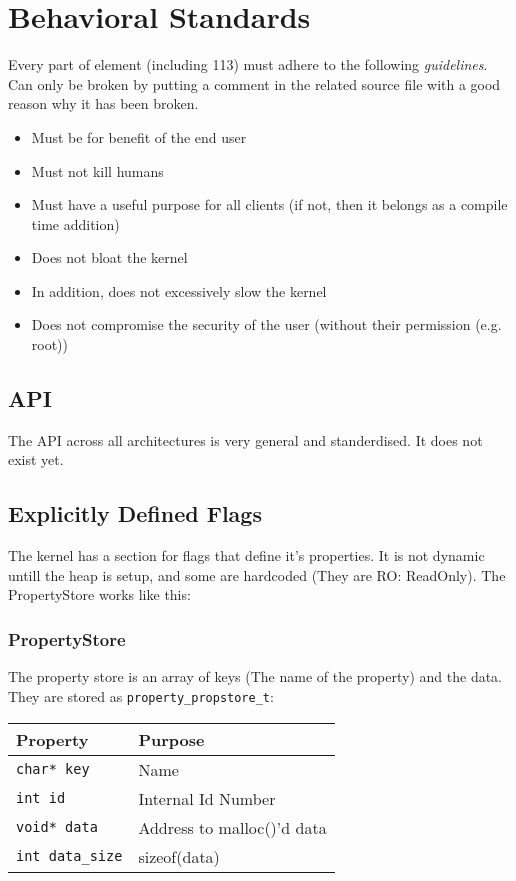 \documentclass[12pt]{article}
\begin{document}
\section{Behavioral Standards}
Every part of element (including 113) must adhere to the following \emph{guidelines}. Can only be broken by putting a comment in the related source file with a good reason why it has been broken.
\begin{itemize}
  \item Must be for benefit of the end user
  \item Must not kill humans
  \item Must have a useful purpose for all clients (if not, then it belongs as a compile time addition)
  \item Does not bloat the kernel
  \item In addition, does not excessively slow the kernel
  \item Does not compromise the security of the user (without their permission (e.g. root))
\end{itemize}

\subsection{API}
The API across all architectures is very general and standerdised. It does not exist yet.
\subsection{Explicitly Defined Flags}
The kernel has a section for flags that define it's properties. It is not dynamic untill the heap is setup, and some are hardcoded (They are RO: ReadOnly). The PropertyStore works like this:
\subsubsection{PropertyStore}
The property store is an array of keys (The name of the property) and the data. They are stored as \verb"property_propstore_t":

\begin{tabular}{ll}
\hline
Property & Purpose \\
\hline
\verb"char* key" & Name\\
\verb"int id" & Internal Id Number\\
\verb"void* data" & Address to malloc()'d data\\
\verb"int data_size" & sizeof(data)\\
\hline
\end{tabular}
\end{document}
